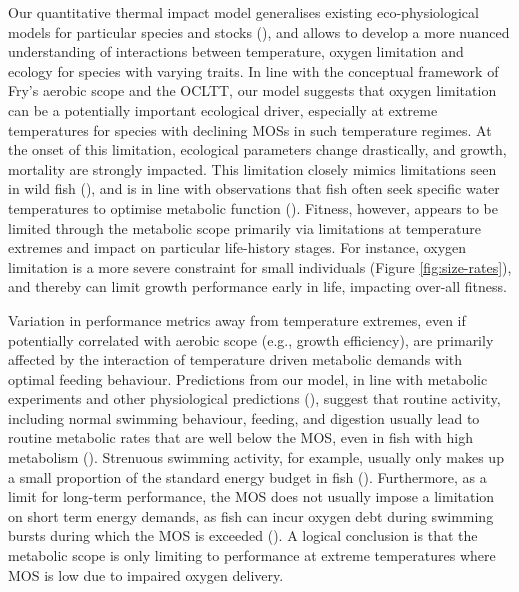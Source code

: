 \documentclass[a4paper, toc=index,abstract=true]{scrartcl}\usepackage[]{graphicx}\usepackage[]{color}
\begin{document}
\begin{spacing}{1.9}
Our quantitative thermal impact model generalises existing eco-physiological models for particular species and stocks (\cite{hufnagl_physiological_2011, holt_climate_2014,holt_climate_2015}), and allows to develop a more nuanced understanding of interactions between temperature, oxygen limitation and ecology for species with varying traits. In line with the conceptual framework of Fry's aerobic scope and the OCLTT, our model suggests that oxygen limitation can be a potentially important ecological driver, especially at extreme temperatures for species with declining MOSs in such temperature regimes. At the onset of this limitation, ecological parameters change drastically, and growth, mortality are strongly impacted. This limitation closely mimics limitations seen in wild fish (\cite{myrick_temperature_2000}), and is in line with observations that fish often seek specific water temperatures to optimise metabolic function (\cite{armstrong_diel_2013,claireaux_physiology_1995}). Fitness, however, appears to be limited through the metabolic scope primarily via limitations at temperature extremes and impact on particular life-history stages. For instance, oxygen limitation is a more severe constraint for small individuals (Figure \ref{fig:size-rates}), and thereby can limit growth performance early in life, impacting over-all fitness. 

Variation in performance metrics away from temperature extremes, even if potentially correlated with aerobic scope (e.g., growth efficiency), are primarily affected by the interaction of temperature driven metabolic demands with optimal feeding behaviour. Predictions from our model, in line with metabolic experiments and other physiological predictions (\cite[e.g., ][]{holt_climate_2014}), suggest that routine activity, including normal swimming behaviour, feeding, and digestion usually lead to routine metabolic rates that are well below the MOS, even in fish with high metabolism (\cite{lucas_utilization_1992,priede_metabolic_1985}). Strenuous swimming activity, for example, usually only makes up a small proportion of the standard energy budget in fish (\cite{priede_natural_1977,priede_metabolic_1985}). Furthermore, as a limit for long-term performance, the MOS does not usually impose a limitation on short term energy demands, as fish can incur oxygen debt during swimming bursts during which the MOS is exceeded (\cite{brett_metabolic_1972,priede_metabolic_1985}). A logical conclusion is that the metabolic scope is only limiting to performance at extreme temperatures where MOS is low due to impaired oxygen delivery.


\end{spacing}
\end{document}

